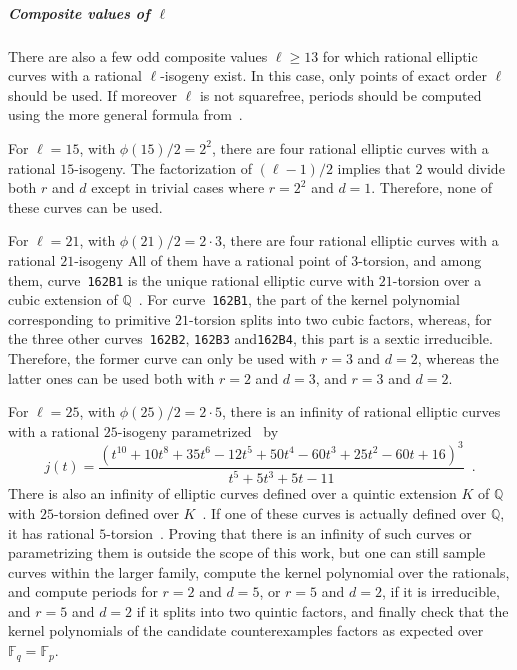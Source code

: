 \documentclass[12pt]{article}
\theoremstyle{plain}
\theoremstyle{definition}
\def\Q{\ensuremath{\mathbb{Q}}}
\def\F{\ensuremath{\mathbb{F}}}
\begin{document}
\subparagraph{Composite values of $\ell$}
There are also a few odd composite values $\ell \geq 13$
for which rational elliptic curves with a rational $\ell$-isogeny exist.
In this case, only points of exact order $\ell$ should be used.
If moreover $\ell$ is not squarefree, periods should be computed
using the more general formula from~\cite{feisel1999normal}.


For $\ell = 15$, with $\phi(15)/2 = 2^2$,
there are four rational elliptic curves with a rational $15$-isogeny.
The factorization of $(\ell-1)/2$ implies
that $2$ would divide both $r$ and $d$
except in trivial cases where $r = 2^2$ and $d = 1$.
Therefore, none of these curves can be used.


For $\ell = 21$, with $\phi(21)/2 = 2\cdot3$,
there are four rational elliptic curves with a rational $21$-isogeny
All of them have a rational point of $3$-torsion,
and among them, curve~\texttt{162B1} is the unique rational elliptic curve
with $21$-torsion over a cubic extension of $\Q$~\cite{najman_cubic}.
For curve~\texttt{162B1},
the part of the kernel polynomial corresponding to primitive $21$-torsion
splits into two cubic factors, whereas,
for the three other curves~\texttt{162B2}, \texttt{162B3} and\texttt{162B4},
this part is a sextic irreducible.
Therefore, the former curve can only be used with $r = 3$ and $d = 2$,
whereas the latter ones can be used both with $r = 2$ and $d = 3$,
and $r = 3$ and $d = 2$.

For $\ell = 25$, with $\phi(25)/2 = 2\cdot5$,
there is an infinity of rational elliptic curves
with a rational $25$-isogeny parametrized~\cite{Lozano-Robledo2013} by
\[
j(t) =
\frac{\left(t^{10}+10t^8+35t^6-12t^5+50t^4-60t^3+25t^2-60t+16\right)^3}
{t^5+5t^3+5t-11}\enspace .
\]
There is also an infinity of elliptic curves defined over a quintic
extension $K$ of $\Q$ with $25$-torsion defined over
$K$~\cite{Derickx201452,2016arXiv160807549D}.
If one of these curves is actually defined over $\Q$,
it has rational $5$-torsion~\cite{gonzalez-jimenez_complete_2016}.
Proving that there is an infinity of such curves or
parametrizing them is outside the scope of this work,
but one can still sample curves within the larger family,
compute the kernel polynomial over the rationals,
and compute periods for $r = 2$ and $d = 5$, or $r = 5$ and $d = 2$,
if it is irreducible,
and $r = 5$ and $d = 2$ if it splits into two quintic factors,
and finally check that the kernel polynomials of the candidate counterexamples
factors as expected over $\F_q = \F_p$.
\end{document}
